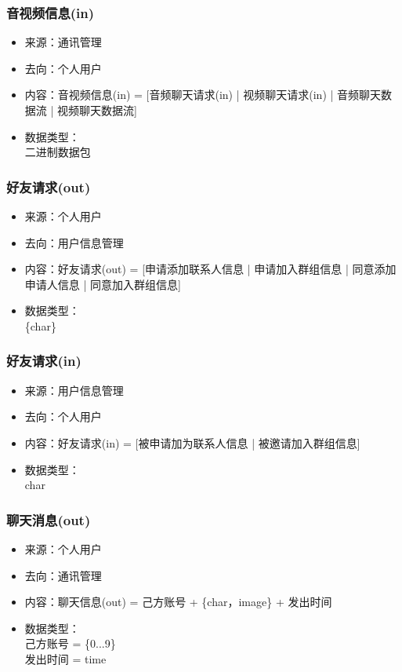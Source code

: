             \subsubsection{音视频信息(in)}
            \begin{itemize}
                    \item 来源：通讯管理
                    \item 去向：个人用户
                    \item 内容：音视频信息(in) = [音频聊天请求(in) | 视频聊天请求(in) | 音频聊天数据流 | 视频聊天数据流]
                    \item 数据类型：\\
                    二进制数据包\\
            \end{itemize}
            \subsubsection{好友请求(out)}
            \begin{itemize}
                \item 来源：个人用户
                \item 去向：用户信息管理
                \item 内容：好友请求(out) = [申请添加联系人信息 | 申请加入群组信息 | 同意添加申请人信息 | 同意加入群组信息]
                \item 数据类型：\\
                \{char\}\\
            \end{itemize}
                \subsubsection{好友请求(in)}
                \begin{itemize}
                    \item 来源：用户信息管理
                    \item 去向：个人用户
                    \item 内容：好友请求(in) = [被申请加为联系人信息 | 被邀请加入群组信息]
                    \item 数据类型：\\{char}
            \end{itemize}
            \subsubsection{聊天消息(out)}
            \begin{itemize}
                \item 来源：个人用户
                \item 去向：通讯管理
                \item 内容：聊天信息(out) = 己方账号 + \{char，image\} + 发出时间
                \item 数据类型：\\己方账号 = \{0...9\}\\
                         发出时间 = time
            \end{itemize}
